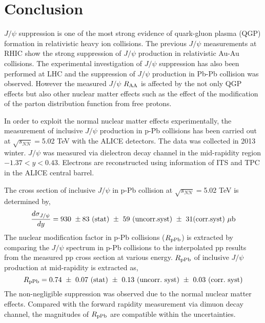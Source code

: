 \chapter{Conclusion }
\label{chap_con}
$J/\psi$ suppression is one of the most strong evidence of quark-gluon plasma (QGP) formation in relativistic heavy ion collisions. 
The previous $J/\psi$ measurements at RHIC show the strong suppression of $J/\psi$ production in relativistic Au-Au collisions. 
The experimental investigation of $J/\psi$ suppression has also been performed at LHC and the suppression of $J/\psi$ production in Pb-Pb collision was observed. 
However the measured $J/\psi$ $R_{\rm{AA}}$ is affected by the not only QGP effects but also other nuclear matter effects such as the effect of the modification of the parton distribution function from free protons. 
 
In order to exploit the normal nuclear matter effects experimentally, 
the measurement of inclusive $J/\psi$ production in p-Pb collisions has been carried out at $\sqrt{s_{NN}}=$5.02 TeV with the ALICE detectors.
The data was collected in 2013 winter. 
$J/\psi$ was measured via dielectron decay channel in the mid-rapidity region $-1.37<y<0.43$. 
Electrons are reconstructed using information of ITS and TPC in the ALICE central barrel. 

The cross section of inclusive $J/\psi$ in p-Pb collision at $\sqrt{s_{NN}}=$5.02 TeV is determined by, 
\begin{equation}
  \frac{d\sigma_{J/\psi}}{dy} =   930 ~\pm 83 ~\rm{(stat)} ~\pm ~59 ~\rm{(uncorr. syst)} ~\pm~ 31\rm{(corr. syst)} ~\mu  \rm{b}
\end{equation}
The nuclear modification factor in p-Pb collisions ($R_{\rm{pPb}}$) is extracted by comparing the $J/\psi$ spectrum in p-Pb collisions to the interpolated pp results from the measured pp cross section at various energy. 
$R_{\rm{pPb}}$ of inclusive $J/\psi$ production at mid-rapidity is extracted as, 
\begin{equation}
 	  R_{\rm{pPb}} = \rm{0.74 ~\pm ~0.07 ~(stat) ~\pm ~0.13 ~(uncorr.~syst) ~\pm ~0.03 ~(corr.~syst) }
\end{equation}
The non-negligible suppression was observed due to the normal nuclear matter effects. 
Compared with the forward rapidity measurement via dimuon decay channel, the magnitudes of $R_{\rm{pPb}}$ are compatible within the uncertainties. 

